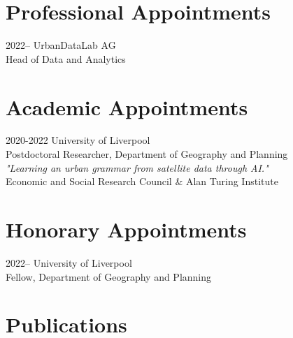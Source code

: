 \documentclass[12pt,a4paper]{report}
\begin{document}
    \section*{Professional Appointments}

    \begin{tablist}

        \item[2022--] \tab{}UrbanDataLab AG \\
                            Head of Data and Analytics \\

    \end{tablist}


    \section*{Academic Appointments}

    \begin{tablist}

        \item[2020-2022] \tab{}University of Liverpool \\
                            Postdoctoral Researcher, Department of Geography and Planning \\
                            \textit{"Learning an urban grammar from satellite data through AI."} \\
                            Economic and Social Research Council \& Alan Turing Institute

    \end{tablist}


    \section*{Honorary Appointments}

    \begin{tablist}

        \item[2022--] \tab{}University of Liverpool \\
                            Fellow, Department of Geography and Planning \\

    \end{tablist}

    \section*{Publications}
\end{document}

